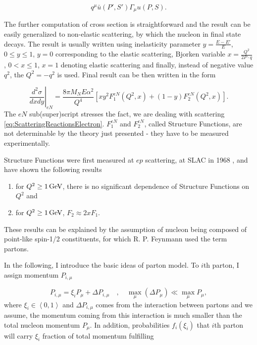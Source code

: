 \begin{equation}
  q^\mu \bar{u}(P',S')\Gamma_\mu u(P,S).
  \label{eq:ScatteringGaugeInvariance}
\end{equation}

The further computation of cross section is straightforward and the result can
be easily generalized to non-elastic scattering, by which the nucleon in final
state decays. The result is usually written using inelasticity parameter
$y=\frac{E-E'}{E}$, $0 \leq y \leq 1$, $y=0$ corresponding to the elastic
scattering, Bjorken variable $ x = \frac{Q^2}{2 P \cdot q}$, $ 0 < x \leq 1$, $x
= 1$ denoting elastic scattering and finally, instead of negative value $q^2$, the
$Q^2 = -q^2$ is used. Final result can be then written in the form

\begin{equation}
  \left. \frac{d^2\sigma}{dxdy} \right|_{eN} =
  \frac{8 \pi M_N E \alpha^2}{Q^4} \left[ x y^2 F_1^{eN}(Q^2, x)
  + (1-y) F_2^{eN}(Q^2,x) \right].
  \label{eq:ScatteringRes1}
\end{equation}
The $eN$ sub(super)script stresses the fact, we are dealing with scattering
\eqref{eq:ScatteringReactionsElectron}. 
$F_1^{eN}$ and $F_2^{eN}$, called Structure Functions, are not determinable by
the theory just presented - they have to be measured experimentally.

Structure Functions were first measured at $ep$ scattering, at SLAC in 1968
\cite{ePScattering}, and have shown the following results
\begin{enumerate}
  \item for $Q^2 \geq 1\,\text{GeV}$, there is no significant dependence of Structure
    Functions on $Q^2$ and
  \item for $Q^2 \geq 1\,\text{GeV}$, $F_2 \approx 2xF_1$.
\end{enumerate}
These results can be explained by the assumption of nucleon being composed of
point-like spin-1/2 constituents, for which R. P. Feynmann used the term
partons. 

In the following, I introduce the basic ideas of parton model. To $i$th parton,
I assign momentum $P_{i,\mu}$

\begin{equation}
  P_{i,\mu} = \xi_i P_\mu + \Delta P_{i,\mu} 
    \quad , \quad \max_\mu (\Delta P_\mu) \ll \max_\mu P_\mu,
  \label{PartonsMomentumDistriburtionAssumption}
\end{equation}
where $\xi_i \in \left< 0, 1 \right>$ and $\Delta P_{i,\mu}$ comes from the
interaction between partons and we assume, the momentum coming from this
interaction is much smaller than the total nucleon momentum $P_\mu$. In
addition, probabilities $f_i(\xi_i)$ that $i$th parton will carry $\xi_i$
fraction of total momentum fulfilling

